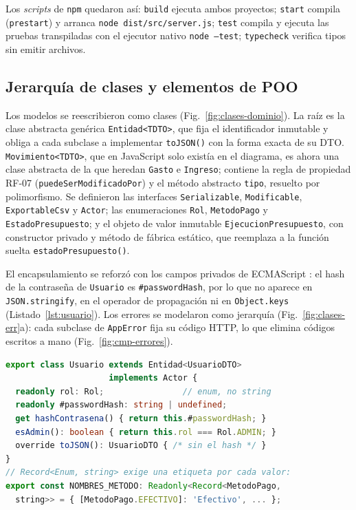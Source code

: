 \documentclass[conference,a4paper]{IEEEtran}
\begin{document}
Los \emph{scripts} de \texttt{npm} quedaron así: \texttt{build} ejecuta ambos proyectos; \texttt{start} compila (\texttt{prestart}) y arranca \texttt{node dist/src/server.js}; \texttt{test} compila y ejecuta las pruebas transpiladas con el ejecutor nativo \texttt{node --test}; \texttt{typecheck} verifica tipos sin emitir archivos.

\subsection{Jerarquía de clases y elementos de POO}\label{sec:jerarquia}
Los modelos se reescribieron como clases (Fig.~\ref{fig:clases-dominio}). La raíz es la clase abstracta genérica \texttt{Entidad<TDTO>}, que fija el identificador inmutable y obliga a cada subclase a implementar \texttt{toJSON()} con la forma exacta de su DTO. \texttt{Movimiento<TDTO>}, que en JavaScript solo existía en el diagrama, es ahora una clase abstracta de la que heredan \texttt{Gasto} e \texttt{Ingreso}; contiene la regla de propiedad RF-07 (\texttt{puedeSerModificadoPor}) y el método abstracto \texttt{tipo}, resuelto por polimorfismo. Se definieron las interfaces \texttt{Serializable}, \texttt{Modificable}, \texttt{ExportableCsv} y \texttt{Actor}; las enumeraciones \texttt{Rol}, \texttt{MetodoPago} y \texttt{EstadoPresupuesto}; y el objeto de valor inmutable \texttt{EjecucionPresupuesto}, con constructor privado y método de fábrica estático, que reemplaza a la función suelta \texttt{estadoPresupuesto()}.

El encapsulamiento se reforzó con los campos privados de ECMAScript \cite{ecma262}: el hash de la contraseña de \texttt{Usuario} es \texttt{\#passwordHash}, por lo que no aparece en \texttt{JSON.stringify}, en el operador de propagación ni en \texttt{Object.keys} (Listado~\ref{lst:usuario}). Los errores se modelaron como jerarquía (Fig.~\ref{fig:clases-err}a): cada subclase de \texttt{AppError} fija su código HTTP, lo que elimina códigos escritos a mano (Fig.~\ref{fig:cmp-errores}).

\begin{lstlisting}[language=TypeScript, caption={Encapsulamiento con campo privado y tipos de enumeración}, label={lst:usuario}]
export class Usuario extends Entidad<UsuarioDTO>
                     implements Actor {
  readonly rol: Rol;                // enum, no string
  readonly #passwordHash: string | undefined;
  get hashContrasena() { return this.#passwordHash; }
  esAdmin(): boolean { return this.rol === Rol.ADMIN; }
  override toJSON(): UsuarioDTO { /* sin el hash */ }
}
// Record<Enum, string> exige una etiqueta por cada valor:
export const NOMBRES_METODO: Readonly<Record<MetodoPago,
  string>> = { [MetodoPago.EFECTIVO]: 'Efectivo', ... };
\end{lstlisting}
\end{document}
